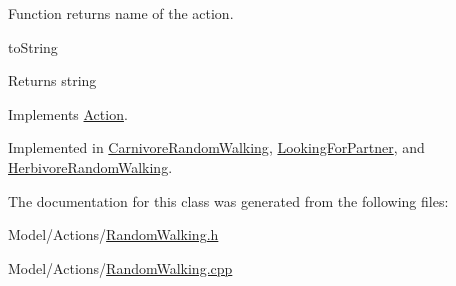 Function returns name of the action. 

to\+String \begin{DoxyReturn}{Returns}
string 
\end{DoxyReturn}


Implements \hyperlink{class_action_a752a31c122f369e92c3e09cdc1a6d617}{Action}.



Implemented in \hyperlink{class_carnivore_random_walking_ae34e8070f9ac8826bb08141c43adcaf5}{Carnivore\+Random\+Walking}, \hyperlink{class_looking_for_partner_a83ef295e8ae6ff29521e0225683bf0af}{Looking\+For\+Partner}, and \hyperlink{class_herbivore_random_walking_a27a17f1ee3d5df3103f3348523c4801a}{Herbivore\+Random\+Walking}.



The documentation for this class was generated from the following files\+:\begin{DoxyCompactItemize}
\item 
Model/\+Actions/\hyperlink{_random_walking_8h}{Random\+Walking.\+h}\item 
Model/\+Actions/\hyperlink{_random_walking_8cpp}{Random\+Walking.\+cpp}\end{DoxyCompactItemize}
